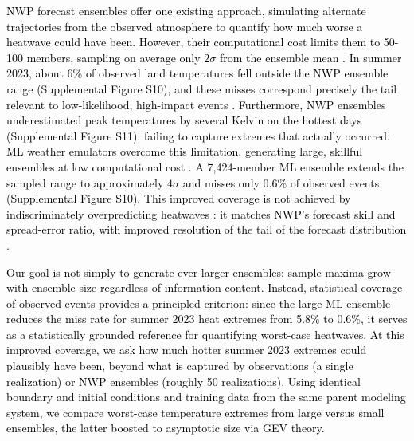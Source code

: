 \documentclass[draft]{agujournal2019}
\renewcommand{\st}[1]{\unskip}
\newcommand{\newTxt}{\textcolor{black}}
\begin{document}
\newTxt{NWP forecast ensembles offer one existing approach, simulating alternate trajectories from the observed atmosphere to quantify how much worse a heatwave could have been. However, their computational cost limits them to 50-100 members, sampling on average only $2\sigma$ from the ensemble mean \citep{Mahesh2024hugeensemblespartii}. In summer 2023, about 6\% of observed land temperatures fell outside the NWP ensemble range (Supplemental Figure S10), and these misses correspond precisely the tail relevant to low-likelihood, high-impact events \citep{Seneviratne2022_book}. Furthermore, NWP ensembles underestimated peak temperatures by several Kelvin on the hottest days (Supplemental Figure S11), failing to capture extremes that actually occurred. ML weather emulators overcome this limitation, generating large, skillful ensembles at low computational cost \citep{Mahesh2024hugeensemblesidesign, Mahesh2024hugeensemblespartii}. A 7,424-member ML ensemble extends the sampled range to approximately $4\sigma$ and misses only 0.6\% of observed events (Supplemental Figure S10). This improved coverage is not achieved by indiscriminately overpredicting heatwaves \citep{Lerch2017}: it matches NWP's forecast skill and spread-error ratio, with improved resolution of the tail of the forecast distribution \citep{Mahesh2024hugeensemblespartii}.}

\newTxt{Our goal is not simply to generate ever-larger ensembles: sample maxima grow with ensemble size regardless of information content. Instead, statistical coverage of observed events provides a principled criterion: since the large ML ensemble reduces the miss rate for summer 2023 heat extremes from 5.8\% to 0.6\%, it serves as a statistically grounded reference for quantifying worst-case heatwaves. At this improved coverage, we ask how much hotter summer 2023 extremes could plausibly have been, beyond what is captured by observations (a single realization) or NWP ensembles (roughly 50 realizations). Using identical boundary and initial conditions and training data from the same parent modeling system, we compare worst-case temperature extremes from large versus small ensembles, the latter boosted to asymptotic size via GEV theory.}

\st{We discuss the time period for this study, the datasets used, and our use of GEV theory in Section 2.  Our results on the information regarding particularly intense heatwaves generated by ML and missing from ERA5 and NWP are detailed in Section 3. Section 4 concludes the paper.}
\end{document}
